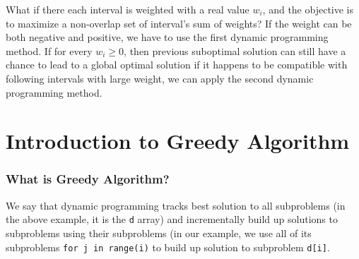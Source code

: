 \documentclass[../main.tex]{subfiles}
\begin{document}
\begin{bclogo}[couleur = blue!30, arrondi=0.1,logo=\bccrayon,ombre=true]{What if there each interval is weighted with a real value $w_i$, and the objective is to maximize a non-overlap set of interval's sum of weights? } {If the weight can be both negative and positive, we have to use the first dynamic programming method. If for every $w_i\geq 0$,  then previous suboptimal solution can still have a chance to lead to a global optimal solution if it happens to be compatible with following intervals with large weight, we can apply the second dynamic programming method.  }
\end{bclogo} 

\section{Introduction to Greedy Algorithm} 
\subsubsection{What is Greedy Algorithm?} We say that dynamic programming tracks best solution to all subproblems (in the above example, it is the \texttt{d} array) and incrementally build up solutions to subproblems using their subproblems  (in our example, we use all of its subproblems \texttt{for j in range(i)} to build up solution to subproblem \texttt{d[i]}.

\end{document}
